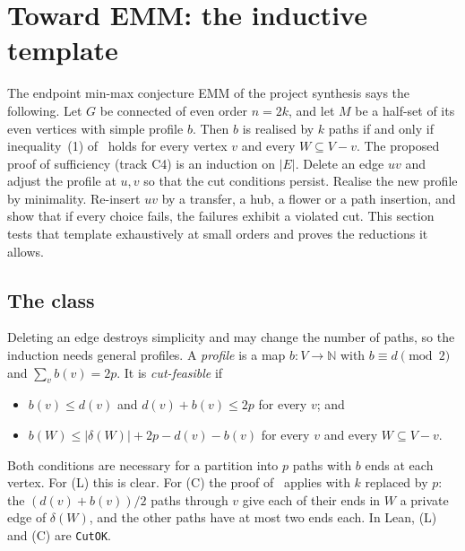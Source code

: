 \documentclass[11pt]{amsart}
\theoremstyle{definition}
\begin{document}
\section{Toward EMM: the inductive template}\label{sec:emm}

The endpoint min-max conjecture EMM of the project synthesis says the following. Let $G$ be connected
of even order $n=2k$, and let $M$ be a half-set of its even vertices with simple profile $b$. Then
$b$ is realised by $k$ paths if and only if inequality~(1) of~\cite[\S12.4]{ED} holds for every
vertex $v$ and every $W\subseteq V-v$. The proposed proof of sufficiency (track C4) is an induction
on $|E|$. Delete an edge $uv$ and adjust the profile at $u,v$ so that the cut conditions persist.
Realise the new profile by minimality. Re-insert $uv$ by a transfer, a hub, a flower or a path
insertion, and show that if every choice fails, the failures exhibit a violated cut. This section
tests that template exhaustively at small orders and proves the reductions it allows.

\subsection*{The class}
Deleting an edge destroys simplicity and may change the number of paths, so the induction needs
general profiles. A \emph{profile} is a map $b:V\to\mathbb N$ with $b\equiv d\pmod 2$ and
$\sum_vb(v)=2p$. It is \emph{cut-feasible} if
\begin{itemize}
\item[(L)] $b(v)\le d(v)$ and $d(v)+b(v)\le2p$ for every $v$; and
\item[(C)] $b(W)\le|\delta(W)|+2p-d(v)-b(v)$ for every $v$ and every $W\subseteq V-v$.
\end{itemize}
Both conditions are necessary for a partition into $p$ paths with $b$ ends at each vertex. For (L)
this is clear. For (C) the proof of~\cite[\S12.4]{ED} applies with $k$ replaced by $p$: the
$(d(v)+b(v))/2$ paths through $v$ give each of their ends in $W$ a private edge of $\delta(W)$, and
the other paths have at most two ends each. In Lean, (L) and (C) are \texttt{CutOK}.
\end{document}
